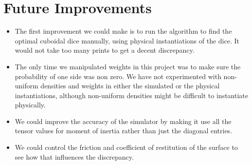 \section{Future Improvements}
\begin{itemize}
    \item The first improvement we could make is to run the algorithm to find the optimal cuboidal dice manually, using physical instantiations of the dice. It would not take too many prints to get a decent discrepancy.\\
    \item The only time we manipulated weights in this project was to make sure the probability of one side was non zero. We have not experimented with non-uniform densities and weights in either the simulated or the physical instantiations, although non-uniform densities might be difficult to instantiate physically.\\
    \item We could improve the accuracy of the simulator by making it use all the tensor values for moment of inertia rather than just the diagonal entries.\\
    \item We could control the friction and coefficient of restitution of the surface to see how that influences the discrepancy.\\
\end{itemize}
